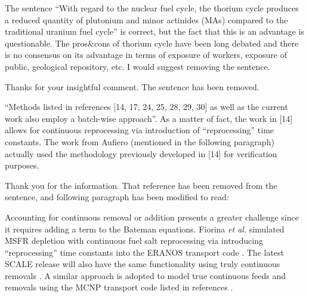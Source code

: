 \documentclass[answers,11pt]{exam}
\begin{document}
\begin{questions}

        \question The sentence ``With regard to the nuclear fuel cycle, the 
        thorium cycle produces a reduced quantity of plutonium and minor 
        actinides (MAs) compared to the traditional uranium fuel cycle'' is 
        correct, but the fact that this is an advantage is questionable. The 
        pros\&cons of thorium cycle have been long debated and there is no 
        consensus on its advantage in terms of exposure of workers, exposure of 
        public, geological repository, etc. I would suggest removing the 
        sentence.
        \begin{solution}
                Thanks for your insightful comment. The sentence has been removed.
        \end{solution}



        \question ``Methods listed in references [14, 17, 24, 25, 28, 29, 30] 
        as well as the current work also employ a batch-wise approach''. As a 
        matter of fact, the work in [14]  allows for continuous reprocessing 
        via introduction of ``reprocessing'' time constants. The work from  
        Aufiero (mentioned in the following paragraph) actually used the 
        methodology previously developed in [14]  for verification purposes.
        \begin{solution}
                Thank you for the information. That reference has been removed from the 
                sentence, and following paragraph has been modified to read:
                
                
                Accounting for continuous removal or addition presents a 
                greater challenge since it requires adding a term to the 
                Bateman equations. Fiorina \emph{et al.} simulated \gls{MSFR} 
                depletion with continuous fuel salt reprocessing via 
                introducing ``reprocessing'' time constants into the ERANOS 
                transport code \cite{fiorina_investigation_2013}.  The latest 
                SCALE release will also have the same functionality using truly 
                continuous removals \cite{betzler_implementation_2017}.  A 
                similar approach is adopted to model true continuous feeds and 
                removals using the MCNP transport code listed in references 
                \cite{doligez_coupled_2014,heuer_towards_2014,nuttin_potential_2005}.


\end{solution}
\end{questions}
\end{document}
